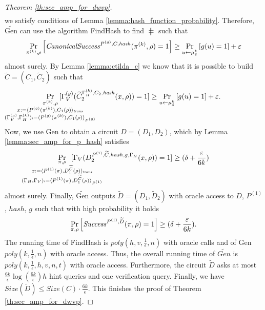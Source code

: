 \begin{proof}[Theorem \ref{th:sec_amp_for_dwvp}]
\begin{align*}
\end{align*}
we satisfy conditions of Lemma \ref{lemma:hash_function_probability}. Therefore, $\widetilde{\text{Gen}}$ can use the algorithm FindHash to find $\hash$ such that
\begin{align*}
    \underset{\pi^{(k)}, \rho}{\Pr}\left[\operatorname{\mathit{CanonicalSuccess}}^{P^{(g)}, C, \operatorname{\mathit{hash}}}(\pi^{(k)}, \rho) = 1\right] \geq \underset{u \leftarrow \mu_\delta^k}{\Pr}\left[g(u) = 1\right] + \varepsilon
\end{align*}
almost surely.
By Lemma \ref{lemma:ctilda_c} we know that it is possible to build $\widetilde{C} = (C_1, \widetilde{C}_2)$ such that
\begin{align*}
    \underset{
      \mathclap {
      \substack{\pi^{(k)}, \rho \\
        x := \langle P^{(g)}(\pi^{(k)}), C_1(\rho) \rangle_{\mathit{trans}} \\
        (\Gamma_V^{(g)}, \Gamma_H^{(k)}) := \langle P^{(g)}(\pi^{(k)}), C_1(\rho) \rangle_{P^{(g)}}
      }}}
    {\Pr}\mkern13mu[\Gamma_V^{(g)}(\widetilde{C}_2^{\Gamma_H^{(k)}, C_2, \hash}(x, \rho)) = 1]
    \geq
\underset{u \leftarrow \mu_\delta^k}{\Pr}\left[g(u) = 1\right] + \varepsilon.
\end{align*}
Now, we use Gen to obtain a circuit $D = (D_1, D_2)$, which by Lemma \ref{lemma:sec_amp_for_p_hash} satisfies
\begin{align}
  \label{eq:succ_prob_d}
    \underset{
      \mathclap{
      \substack{\pi, \rho \\ x := \langle P^{(1)}(\pi), D_1^{\widetilde{C}}(\rho) \rangle_{\mathit{trans}} \\
        (\Gamma_H, \Gamma_V) := \langle P^{(1)}(\pi), D_1^{\widetilde{C}}(\rho) \rangle_{P^{(1)}}}}}
    {\Pr}\mkern13mu[\Gamma_V(D_2^{P^{(1)}, \widetilde{C}, hash, g, \Gamma_H}(x, \rho)) = 1] \geq (\delta + \frac{\varepsilon}{6k})
\end{align}
almost surely.
Finally, $\widetilde{\text{Gen}}$ outputs $\widetilde{D} = (D_1, \widetilde{D}_2)$ with oracle access to $D$, $P^{(1)}$, $hash$, $g$ such that with high probability it holds
\begin{align*}
    \underset{\pi, \rho}{\Pr}\left[\operatorname{\mathit{Success}}^{P^{(1)},\widetilde{D}}(\pi, \rho) = 1\right] \geq (\delta + \frac{\varepsilon}{6k}).
\end{align*}
The running time of FindHash is $\mathit{poly}(h,v,\frac{1}{\epsilon},n)$ with oracle calls and of Gen $\mathit{poly(k, \frac{1}{\epsilon}, n)}$ with oracle access.
Thus, the overall running time of $\widetilde{\mathit{Gen}}$ is  $\mathit{poly(k,\frac{1}{\epsilon},h,v,n,t)}$ with oracle access.
Furthermore, the circuit $\widetilde{D}$ asks at most $\frac{6k}{\epsilon} \log(\frac{6k}{\epsilon})h$ hint queries and one verification query.
Finally, we have $\mathit{Size}(\widetilde{D}) \leq \mathit{Size}(C) \cdot \frac{6k}{\epsilon}$.
This finishes the proof of Theorem \ref{th:sec_amp_for_dwvp}.
\end{proof}

